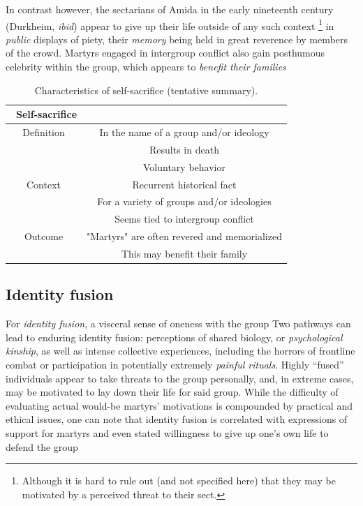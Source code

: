 \documentclass[a4paper,12pt]{report}
\begin{document}
In contrast however, the sectarians of Amida in the early nineteenth century
(Durkheim, \emph{ibid}) appear to give up their life outside of any such context
\footnote{Although it is hard to rule out (and not specified here) that they
may be motivated by a perceived threat to their sect.}
in \emph{public} displays of piety, their \emph{memory} being held in great reverence 
by members of the crowd. Martyrs engaged in intergroup conflict 
also gain posthumous celebrity within the group, which appears to \emph{benefit
their families}
\begin{table}[h]
    \centering
    \begin{tabular}{|c | c | } 
        \hline\
        Self-sacrifice & \\ [1ex] 
        \hline\hline
        Definition & In the name of a group and/or ideology\\ [0.5ex]
        & Results in death  \\ [0.5ex]
        & Voluntary behavior \\ [0.5ex]
        \hline\hline
        Context & Recurrent historical fact \\ [0.5ex]
         & For a variety of groups and/or ideologies \\ [0.5ex]
         & Seems tied to intergroup conflict \\ [0.5ex]
        \hline\hline
        Outcome & "Martyrs" are often revered and memorialized   \\ [0.5ex]
        & This may benefit their family   \\ [0.5ex]
        \hline\hline
    \end{tabular}
    \caption{Characteristics of self-sacrifice (tentative summary).}
\label{t:charac_ss}
\end{table}

\subsection{Identity fusion}
For %
\emph{identity fusion}, a visceral sense of oneness with the group %
Two pathways can lead to enduring identity fusion: perceptions of shared biology, 
or \emph{psychological kinship}, as well as intense collective experiences,
including the horrors of frontline combat or participation in potentially extremely 
\emph{painful rituals}. Highly “fused” individuals appear to take threats
to the group personally, and, in extreme cases, may be motivated to lay down their life
for said group. While the difficulty of evaluating actual would-be martyrs’ motivations
is compounded by practical and ethical issues, one can note that identity fusion is 
correlated with expressions of support for martyrs and even stated willingness to give up one’s 
own life to defend the group %
\end{document}
